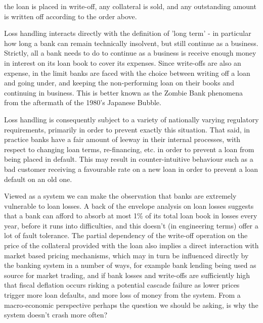 \documentclass[10pt,oneside,openright, a4paper]{memoir}
\begin{document}
the loan is placed in write-off, any collateral is sold, and any outstanding
amount is written off according to the order above.
\par
Loss handling interacts directly with the definition of 'long term' - 
in particular how long a bank can remain technically insolvent, but
still continue as a business. Strictly, all a bank needs to do to
continue as a business is receive enough money in interest on its
loan book to cover its expenses. Since write-offs are also an expense,
in the limit banks are faced with the choice between writing off
a loan and going under, and keeping the non-performing loan on their
books and continuing in business. This is better known as the Zombie
Bank phenomena from the aftermath of the 1980's Japanese Bubble.
\par
Loss handling is consequently subject to a variety of nationally
varying regulatory requirements, primarily in order to prevent exactly
this situation. That said, in practice 
banks have a fair amount of leeway in their internal processes, with
respect to changing loan terms, re-financing, etc. in order to prevent
a loan from being placed in default. This may result in counter-intuitive
behaviour such as a bad customer receiving a favourable rate on a new
loan in order to prevent a loan default on an old one. 
\par
Viewed as a system we can make the observation that banks are extremely
vulnerable to loan losses. A back of the envelope analysis on loan
losses suggests that a bank can afford to absorb at most 1\% of its
total loan book in losses every year, before it runs into difficulties,
and this doesn't (in engineering terms) offer a lot of fault tolerance.
The partial dependency of the write-off operation on the price of the 
collateral provided with the loan
also implies a direct interaction with market based pricing mechanisms,
which may in turn be influenced directly by the banking system in 
a number of ways, for example bank lending being used as source for
market trading, and if bank 
losses and write-offs are sufficiently high that fiscal deflation 
occurs risking a potential cascade failure as lower prices trigger
more loan defaults, and more loss of money from the system. 
From a macro-economic perspective perhaps the question we should
be asking, is why the system doesn't crash more often?
\end{document}
